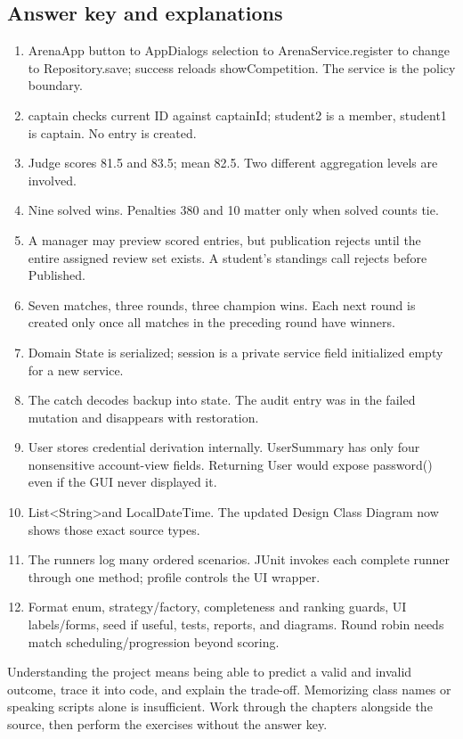 \documentclass[12pt]{article}
\begin{document}
\subsection{Answer key and explanations}
\begin{enumerate}
\item ArenaApp button to AppDialogs selection to ArenaService.register to change to Repository.save; success reloads showCompetition. The service is the policy boundary.
\item captain checks current ID against captainId; student2 is a member, student1 is captain. No entry is created.
\item Judge scores 81.5 and 83.5; mean 82.5. Two different aggregation levels are involved.
\item Nine solved wins. Penalties 380 and 10 matter only when solved counts tie.
\item A manager may preview scored entries, but publication rejects until the entire assigned review set exists. A student's standings call rejects before Published.
\item Seven matches, three rounds, three champion wins. Each next round is created only once all matches in the preceding round have winners.
\item Domain State is serialized; session is a private service field initialized empty for a new service.
\item The catch decodes backup into state. The audit entry was in the failed mutation and disappears with restoration.
\item User stores credential derivation internally. UserSummary has only four nonsensitive account-view fields. Returning User would expose password() even if the GUI never displayed it.
\item List\textless String\textgreater and LocalDateTime. The updated Design Class Diagram now shows those exact source types.
\item The runners log many ordered scenarios. JUnit invokes each complete runner through one method; profile controls the UI wrapper.
\item Format enum, strategy/factory, completeness and ranking guards, UI labels/forms, seed if useful, tests, reports, and diagrams. Round robin needs match scheduling/progression beyond scoring.
\end{enumerate}

Understanding the project means being able to predict a valid and invalid outcome, trace it into code, and explain the trade-off. Memorizing class names or speaking scripts alone is insufficient. Work through the chapters alongside the source, then perform the exercises without the answer key.
\end{document}
